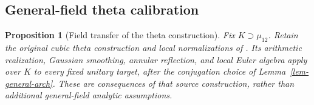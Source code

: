 \documentclass[11pt,a4paper]{article}
\newtheorem{proposition}[theorem]{Proposition}
\theoremstyle{remark}\newtheorem{remark}[theorem]{Remark}
\numberwithin{equation}{section}
\begin{document}
\subsection{General-field theta calibration}
\label{subsec-theta-transfer}

\begin{proposition}[Field transfer of the theta construction]
\label{prop-theta-transfer}
Fix $K\supset\mu_{12}$.  Retain the original cubic theta construction
and local normalizations of \cite[Proposition 5.1 and Appendix A]{P}.
Its arithmetic realization, Gaussian smoothing, annular reflection,
and local Euler algebra apply over $K$ to every fixed unitary target,
after the conjugation choice of Lemma~\ref{lem-general-arch}.
These are consequences of that source construction, rather than
additional general-field analytic assumptions.
\end{proposition}
\end{document}
